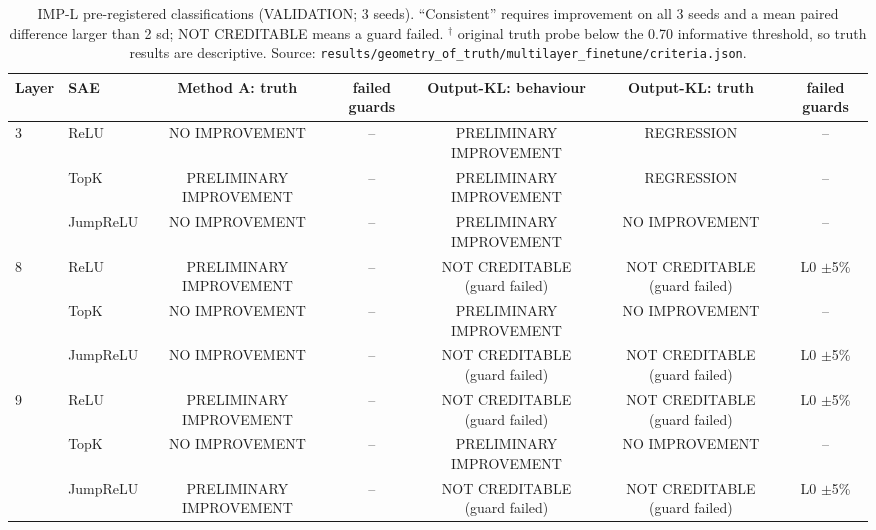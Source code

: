 \begin{table}[t]
\centering
\small
\caption{IMP-L pre-registered classifications (VALIDATION; 3 seeds). ``Consistent'' requires improvement on all 3 seeds and a mean paired difference larger than 2 sd; NOT CREDITABLE means a guard failed. $^\dagger$ original truth probe below the 0.70 informative threshold, so truth results are descriptive. Source: \texttt{results/\allowbreak{}geometry\_of\_truth/\allowbreak{}multilayer\_finetune/\allowbreak{}criteria.json}.}
\label{tab:impl_summary}
\begin{adjustbox}{max width=\linewidth}
\begin{tabular}{llccccc}
\toprule
Layer & SAE & Method A: truth & failed guards & Output-KL: behaviour & Output-KL: truth & failed guards \\
\midrule
3 & ReLU & NO IMPROVEMENT & -- & PRELIMINARY IMPROVEMENT & REGRESSION & -- \\
 & TopK & PRELIMINARY IMPROVEMENT & -- & PRELIMINARY IMPROVEMENT & REGRESSION & -- \\
 & JumpReLU & NO IMPROVEMENT & -- & PRELIMINARY IMPROVEMENT & NO IMPROVEMENT & -- \\
\midrule
8 & ReLU & PRELIMINARY IMPROVEMENT & -- & NOT CREDITABLE (guard failed) & NOT CREDITABLE (guard failed) & L0 $\pm$5\% \\
 & TopK & NO IMPROVEMENT & -- & PRELIMINARY IMPROVEMENT & NO IMPROVEMENT & -- \\
 & JumpReLU & NO IMPROVEMENT & -- & NOT CREDITABLE (guard failed) & NOT CREDITABLE (guard failed) & L0 $\pm$5\% \\
\midrule
9 & ReLU & PRELIMINARY IMPROVEMENT & -- & NOT CREDITABLE (guard failed) & NOT CREDITABLE (guard failed) & L0 $\pm$5\% \\
 & TopK & NO IMPROVEMENT & -- & PRELIMINARY IMPROVEMENT & NO IMPROVEMENT & -- \\
 & JumpReLU & PRELIMINARY IMPROVEMENT & -- & NOT CREDITABLE (guard failed) & NOT CREDITABLE (guard failed) & L0 $\pm$5\% \\
\bottomrule
\end{tabular}
\end{adjustbox}
\end{table}
